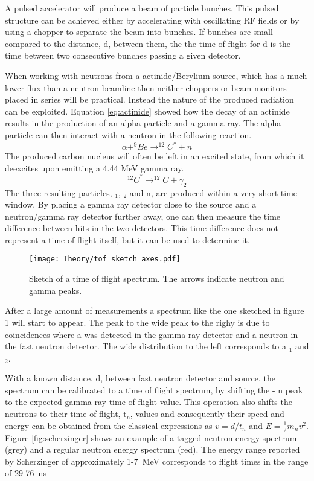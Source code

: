 \documentclass[main.tex]{subfiles}
\begin{document}
A pulsed accelerator will produce a beam of particle bunches. This pulsed structure can be achieved either by accelerating with oscillating RF fields or by using a chopper to separate the beam into bunches. If bunches are small compared to the distance, d, between them, the the time of flight for d is the time between two consecutive bunches passing a given detector.

When working with neutrons from a actinide/Berylium source, which has a much lower flux than a neutron beamline then neither choppers or beam monitors placed in series will be practical. Instead the nature of the produced radiation can be exploited. Equation \ref{eq:actinide} showed how the decay of an actinide results in the production of an alpha particle and a gamma ray. The alpha particle can then interact with a neutron in the following reaction.
$$\alpha+^{9}Be\rightarrow^{12}C^{*}+n$$
The produced carbon nucleus will often be left in an excited state, from which it deexcites upon emitting a 4.44 MeV gamma ray. 
$$^{12}C^ {*}\rightarrow^{12}C+\gamma_2$$
The three resulting particles, \textgamma$_\text{1}$, \textgamma$_\text{2}$ and n, are produced within a very short time window. By placing a gamma ray detector close to the source and a neutron/gamma ray detector further away, one can then measure the time difference between hits in the two detectors. This time difference does not represent a time of flight itself, but it can be used to determine it. 

\begin{figure}[t]
    \centering
        \texttt{[image: Theory/tof\_sketch\_axes.pdf]}
        \caption[Sketch of a time of flight spectrum.]{Sketch of a time of flight spectrum. The arrows indicate neutron and gamma peaks.}
    \label{fig:tof_sketch} 
\end{figure}

After a large amount of measurements a spectrum like the one sketched in figure \ref{fig:tof_sketch} will start to appear. The peak to the wide peak to the righy is due to coincidences where a \textgamma\; was detected in the gamma ray detector and a neutron in the fast neutron detector. The wide distribution to the left corresponds to a \textgamma$_\text{1}$ and \textgamma$_\text{2}$.

With a known distance, d, between fast neutron detector and source, the spectrum can be calibrated to a time of flight spectrum, by shifting the \textgamma - n peak to the expected gamma ray time of flight value. This operation also shifts the neutrons to their time of flight, t$_\text{n}$, values and consequently their speed and energy can be obtained from the classical expressions as $v=d/t_n$ and $E=\frac{1}{2}m_n v^2$. Figure \ref{fig:scherzinger} shows an example of a tagged neutron energy spectrum (grey) and a regular neutron energy spectrum (red). The energy range reported by Scherzinger of approximately 1-\SI{7}{MeV} corresponds to flight times in the range of 29-\SI{76}{\ns}
\end{document}
